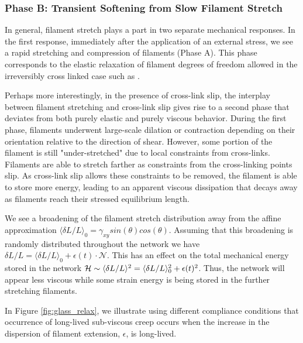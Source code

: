 \documentclass[pre,preprint]{revtex4-1}
\begin{document}
\subsubsection{Phase B: Transient Softening from Slow Filament Stretch}
\label{sec:compliant}
In general, filament stretch plays a part in two separate mechanical responses.  In the first response, immediately after the application of an external stress, we see a rapid stretching and compression of filaments (Phase A). This phase corresponds to the elastic relaxation of filament degrees of freedom allowed in the irreversibly cross linked case such as \cite{theo_hlm,theo_hlm2}.  

Perhaps more interestingly, in the presence of cross-link slip, the interplay between filament stretching and cross-link slip gives rise to a second phase that deviates from both purely elastic and purely viscous behavior.  During the first phase, filaments underwent large-scale dilation or contraction depending on their orientation relative to the direction of shear.  However, some portion of the filament is still "under-stretched" due to local constraints from cross-links.  Filaments are able to stretch farther as constraints from the cross-linking points slip.  As cross-link slip allows these constraints to be removed, the filament is able to store more energy, leading to an apparent viscous dissipation that decays away as filaments reach their stressed equilibrium length. 

We see a broadening of the filament stretch distribution away from the affine approximation $\langle \delta L/L\rangle_0 = \gamma_{xy}sin(\theta)cos(\theta)$.  Assuming that this broadening is randomly distributed throughout the network we have $\delta L/L = \langle \delta L/L\rangle_0 + \epsilon(t)\cdot\mathcal{N}$.  This has an effect on the total mechanical energy stored in the network ${\cal H} \sim  \langle\delta L/L\rangle^2 = \langle\delta L/L\rangle_0^2 +\epsilon(t)^2 $.  Thus, the network will appear less viscous while some strain energy is being stored in the further stretching filaments.  

In Figure \ref{fig:glass_relax}, we illustrate using different compliance conditions that occurrence of long-lived sub-viscous creep occurs when the increase in the dispersion of filament extension, $\epsilon$, is long-lived.
\end{document}
